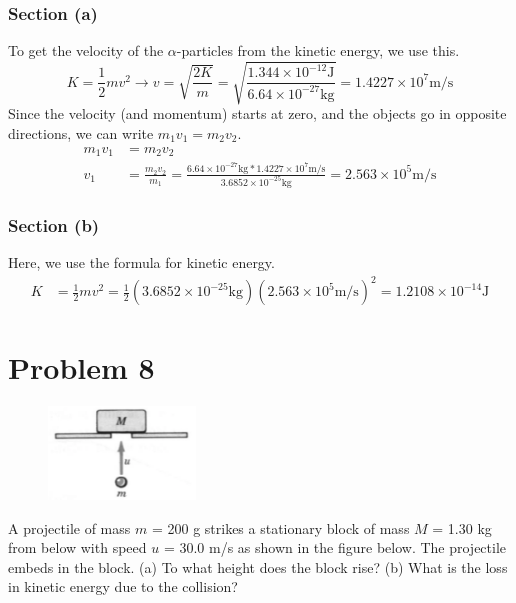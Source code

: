 \documentclass[12pt]{article}
\begin{document}
\subsubsection*{Section (a)}
To get the velocity of the $\alpha$-particles from the kinetic energy, we use this.
\begin{equation*}
    K   =   \frac{1}{2}mv^2\rightarrow
    v   =   \sqrt{\frac{2K}{m}} 
        =   \sqrt{\frac{1.344 \times 10^{-12}\unit{\joule}}{6.64\times 10^{-27}\unit{\kilo\gram}}}
        =   1.4227\times10^7 \unit{\meter/\second}
\end{equation*}
Since the velocity (and momentum) starts at zero, and the objects go in opposite directions, we can write \(m_1v_1 = m_2v_2\).
\begin{align*}
    m_1v_1  &= m_2v_2\\
    v_1 &=  \frac{m_2v_2}{m_1}
        =   \frac{6.64\times 10^{-27}\unit{\kilo\gram} * 1.4227\times10^7 \unit{\meter/\second}}{3.6852\times 10^{-25}\unit{\kilo\gram}}
        =   \boxed{2.563\times10^5 \unit{\meter/\second}}
\end{align*}

\subsubsection*{Section (b)}
Here, we use the formula for kinetic energy.
\begin{align*}
    K   &=  \frac{1}{2}mv^2
        =   \frac{1}{2}(3.6852\times 10^{-25}\unit{\kilo\gram})(2.563\times10^5 \unit{\meter/\second})^2
        =   \boxed{1.2108\times10^{-14} \unit{\joule}}
\end{align*}


\pagebreak
\section*{Problem 8}
\begin{figure}
    \vspace{-30pt}
    \includegraphics[width=0.35\textwidth]{graph_8.png} 
\end{figure}
A projectile of mass $m$ = 200 g strikes a stationary block of mass $M$ = 1.30 kg from below with speed $u$ = 30.0 m/s as shown in the figure below. The projectile embeds in the block. (a) To what height does the block rise? (b) What is the loss in kinetic energy due to the collision?
\end{document}
